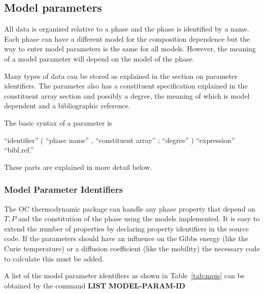 \documentclass[11pt]{article}
\begin{document}
\subsection{Model parameters}

All data is organized relative to a phase and the phase is identified
by a name.  Each phase can have a different model for the composition
dependence but the way to enter model parameters is the same for all
models.  However, the meaning of a model parameter will depend on the
model of the phase.

Many types of data can be stored as explained in the section on
parameter identifiers.  The parameter also has a constituent
specification explained in the constituent array section and possibly
a degree, the meaning of which is model dependent and a bibliographic
reference.

The basic syntax of a parameter is

``identifier'' ( ``phase name'' , ``constituent array'' ; ``degree'' ) ``expression'' ``bibl.ref.''

These parts are explained in more detail below.

\subsubsection{Model Parameter Identifiers}\label{sc:paramid}

The OC thermodynamic package can handle any phase property that depend
on $T, P$ and the constitution of the phase using the models
implemented.  It is easy to extend the number of properties by
declaring property identifiers in the source code.  If the parameters
should have an influence on the Gibbs energy (like the Curie
temperature) or a diffusion coefficient (like the mobility) the
necessary code to calculate this must be added.

A list of the model parameter identifiers as shown in
Table~\ref{tab:mpis} can be obtained by the command {\bf LIST
  MODEL-PARAM-ID}
\end{document}
